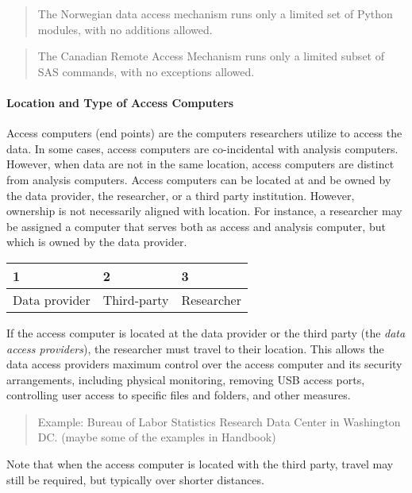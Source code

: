\begin{quote}
The Norwegian data access mechanism runs only a limited set of Python
modules, with no additions allowed.
\end{quote}

\begin{quote}
The Canadian Remote Access Mechanism runs only a limited subset of SAS
commands, with no exceptions allowed.
\end{quote}

\hypertarget{location-and-type-of-access-computers}{%
\paragraph{Location and Type of Access
Computers}\label{location-and-type-of-access-computers}}

Access computers (end points) are the computers researchers utilize to
access the data. In some cases, access computers are co-incidental with
analysis computers. However, when data are not in the same location,
access computers are distinct from analysis computers. Access computers
can be located at and be owned by the data provider, the researcher, or
a third party institution. However, ownership is not necessarily aligned
with location. For instance, a researcher may be assigned a computer
that serves both as access and analysis computer, but which is owned by
the data provider.

\begin{longtable}[]{@{}lll@{}}
\toprule
1 & 2 & 3\tabularnewline
\midrule
\endhead
Data provider & Third-party & Researcher\tabularnewline
\bottomrule
\end{longtable}

If the access computer is located at the data provider or the third
party (the \emph{data access providers}), the researcher must travel to
their location. This allows the data access providers maximum control
over the access computer and its security arrangements, including
physical monitoring, removing USB access ports, controlling user access
to specific files and folders, and other measures.

\begin{quote}
Example: Bureau of Labor Statistics Research Data Center in Washington
DC. (maybe some of the examples in Handbook)
\end{quote}

Note that when the access computer is located with the third party,
travel may still be required, but typically over shorter distances.

